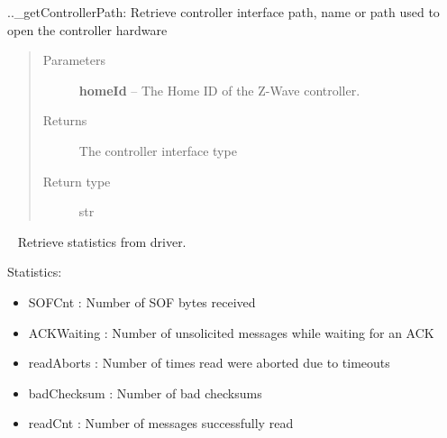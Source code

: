 \documentclass[letterpaper,10pt,english]{sphinxmanual}
\begin{document}
\begin{fulllineitems}
\begin{fulllineitems}
\begin{quote}
\begin{description}
\end{description}\end{quote}

\end{fulllineitems}


\begin{fulllineitems}
\label{libopenzwave:libopenzwave.PyManager.getControllerPath}
..\_getControllerPath:
Retrieve controller interface path, name or path used to open the controller hardware
\begin{quote}\begin{description}
\item[{Parameters}] \leavevmode
\textbf{homeId} -- The Home ID of the Z-Wave controller.

\item[{Returns}] \leavevmode
The controller interface type

\item[{Return type}] \leavevmode
str

\end{description}\end{quote}

\end{fulllineitems}


\begin{fulllineitems}
\label{libopenzwave:libopenzwave.PyManager.getDriverStatistics}~\label{libopenzwave:getdriverstatistics}
Retrieve statistics from driver.

Statistics:
\begin{itemize}
\item {} 
SOFCnt : Number of SOF bytes received

\item {} 
ACKWaiting : Number of unsolicited messages while waiting for an ACK

\item {} 
readAborts : Number of times read were aborted due to timeouts

\item {} 
badChecksum : Number of bad checksums

\item {} 
readCnt : Number of messages successfully read


\end{itemize}
\end{fulllineitems}
\end{fulllineitems}
\end{document}
